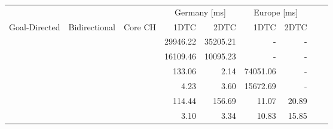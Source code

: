 \begin{tabular}{cccrrrrrr}
	\toprule
	              &               &         & \multicolumn{2}{c}{Germany [\si{\milli\second}]} & \multicolumn{2}{c}{Europe [\si{\milli\second}]}               \\
	Goal-Directed & Bidirectional & Core CH & 1DTC                                             & 2DTC                                            & 1DTC & 2DTC \\
	\midrule
	\xmark        & \xmark        & \xmark  & 29946.22                                                & 35205.21                                               & -    & -    \\
	\xmark        & \cmark        & \xmark  & 16109.46                                                & 10095.23                                               & -    & -    \\
	\cmark        & \xmark        & \xmark  & 133.06                                                & 2.14                                               & 74051.06    & -    \\
	\cmark        & \cmark        & \xmark  & 4.23                                                & 3.60                                               & 15672.69    & -    \\
	\xmark        & \cmark        & \cmark  & 114.44                                                & 156.69                                               & 11.07    & 20.89    \\
	\cmark        & \cmark        & \cmark  & 3.10                                                & 3.34                                               & 10.83    & 15.85    \\
	\bottomrule
\end{tabular}